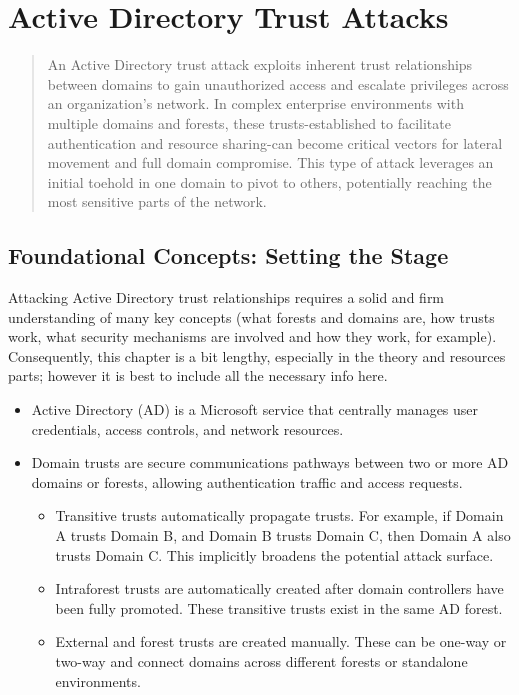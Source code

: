 \frontmatter          %
%
\pagestyle{headings}  %
%
\chapter*{Active Directory Trust Attacks}
\begin{abstract}
    An Active Directory trust attack exploits inherent trust relationships between domains to gain unauthorized access and escalate privileges across an organization's network. In complex enterprise environments with multiple domains and forests, these trusts-established to facilitate authentication and resource sharing-can become critical vectors for lateral movement and full domain compromise. This type of attack leverages an initial toehold in one domain to pivot to others, potentially reaching the most sensitive parts of the network.
\end{abstract}
\section{Foundational Concepts: Setting the Stage}
Attacking Active Directory trust relationships requires a solid and firm understanding of many key concepts (what forests and domains are, how trusts work, what security mechanisms are involved and how they work, for example). Consequently, this chapter is a bit lengthy, especially in the theory and resources parts; however it is best to include all the necessary info here.

\begin{itemize}
    \item Active Directory (AD) is a Microsoft service that centrally manages user credentials, access controls, and network resources.
    \item Domain trusts are secure communications pathways between two or more AD domains or forests, allowing authentication traffic and access requests.
    \begin{itemize}
    \item  Transitive trusts automatically propagate trusts. For example, if Domain A trusts Domain B, and Domain B trusts Domain C, then Domain A also trusts Domain C. This implicitly broadens the potential attack surface.
    \item Intraforest trusts are automatically created after domain controllers have been fully promoted. These transitive trusts exist in the same AD forest.
        \item External and forest trusts are created manually. These can be one-way or two-way and connect domains across different forests or standalone environments.
    \end{itemize}
\end{itemize}


